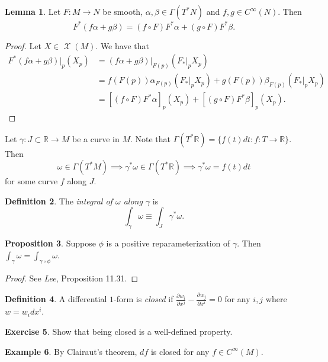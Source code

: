 \documentclass[10pt,letterpaper,cm]{nupset}
\theoremstyle{definition}
\newtheorem{definition}{Definition}[subsection]
\newtheorem{exmp}[definition]{Example}
\theoremstyle{theorem}
\newtheorem{lemma}[definition]{Lemma}
\newtheorem{prop}[definition]{Proposition}
\newtheorem{exercise}[definition]{Exercise}
\theoremstyle{remark}
\newcommand{\R}{\mathbb R}
\newcommand{\1}{\mathbf{1}}
\newcommand{\0}{\vec 0}
\DeclareMathOperator{\vf}{\mathscr{X}}
\begin{document}
\begin{lemma}
Let $F: M \to N$ be smooth, $\alpha, \beta \in \Gamma(T^{\ast} N)$ and $f, g \in C^{\infty}(N)$. Then $$F^{\ast}(f \alpha + g \beta) = (f \circ F)F^{\ast} \alpha + (g \circ F)F^{\ast} \beta.$$
\end{lemma}
\begin{proof}
Let $X \in \vf(M)$. We have that
\begin{align*}
F^{\ast}(f \alpha + g\beta)\bigr\rvert_p(X_p) & = (f \alpha + g \beta)\bigr\rvert_{F(p)}\left(F_{\ast}\bigr\rvert_p X_p\right) 
\\ & = 
f\left(F(p)\right)\alpha_{F(p)}\left(F_{\ast}\bigr\rvert_p  X_p\right)+ g\left(F(p)\right)\beta_{F(p)}\left(F_{\ast}\bigr\rvert_p X_p\right)
\\ &   = \left[(f\circ F)F^{\ast}\alpha\right]_p (X_p) + \left[(g\circ F) F^{\ast}\beta\right]_p(X_p).
\end{align*}
\end{proof}

Let $\gamma : J \subset \R \to M$ be a curve in $M$.  Note that $\Gamma(T^{\ast}\R) = \{f(t)dt : f : T \to \R\}$. Then
$$ \omega \in \Gamma(T^{\ast}M) \implies \gamma^{\ast} \omega \in \Gamma(T^{\ast}\R) \implies \gamma^{\ast}\omega = f(t)dt$$ for some curve $f$ along $J$.

\begin{definition}
The \textit{integral of $\omega$ along $\gamma$} is $$\int_{\gamma} \omega \equiv \int_J \gamma^{\ast}\omega.$$ 
\end{definition}

\begin{prop}
Suppose $\phi$ is a positive reparameterization of $\gamma$. Then $\int_{\gamma} \omega = \int_{\gamma \circ \phi} \omega$.
\end{prop}
\begin{proof}
See \textit{Lee}, Proposition 11.31.
\end{proof}

\begin{definition}
A differential $1$-form is \textit{closed} if $\frac{\partial{w_i}}{\partial{x^j}} - \frac{\partial{w_j}}{\partial{x^i}} =0$ for any $i,j$ where $w = w_i dx^i$.
\end{definition}

\begin{exercise}
Show that being closed is a well-defined property.
\end{exercise}

\begin{exmp}
By Clairaut's theorem, $df$ is closed for any $f\in C^{\infty}(M)$. 
\end{exmp}
\end{document}
